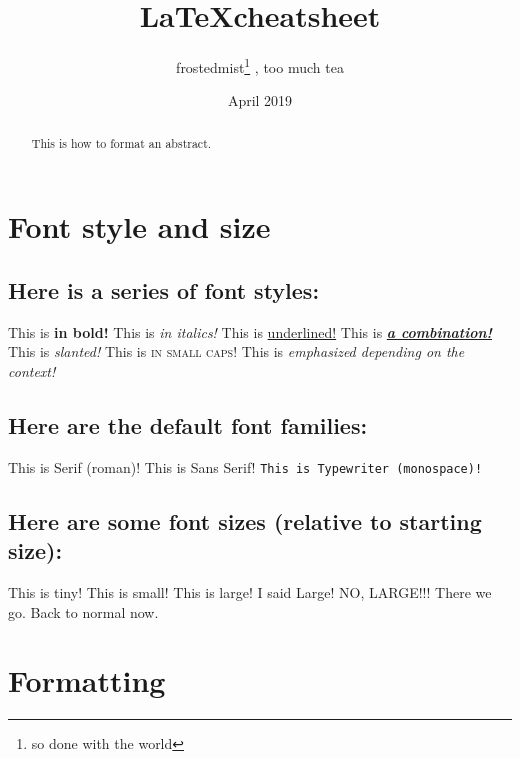\documentclass[12pt, letterpaper]{article} %
\title{\LaTeX cheatsheet} %
\author{frostedmist\thanks{so done with the world} , too much tea} %
\date{April 2019} %
\begin{document}

\maketitle %

\section{Font style and size}

\subsection*{Here is a series of font styles:}

This is \textbf{in bold!} 
This is \textit{in italics!}
This is \underline{underlined!}
This is \textbf{\textit{\underline{a combination!}}}
This is \textsl{slanted!}
This is \textsc{in small caps!}
This is \emph{emphasized depending on the context!} %

\subsection*{Here are the default font families:}

\textrm{This is Serif (roman)!}
\textsf{This is Sans Serif!}
\texttt{This is Typewriter (monospace)!}

\subsection*{Here are some font sizes (relative to starting size):} %

\tiny{This is tiny!}
\small{This is small!}
\large{This is large!}
\Large{I said Large!}
\LARGE{NO, LARGE!!!}
\huge{There we go.}
\normalsize{Back to normal now.}

\clearpage %

\section{Formatting}

\begin{abstract}
	This is how to format an abstract.
\end{abstract}
\end{document}
